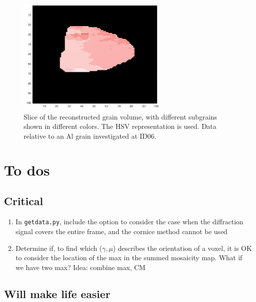 \documentclass[11pt]{scrartcl}
\begin{document}
\begin{figure}[h]
    \centering
    \includegraphics[width=0.65\textwidth]{Mosaicity_slice_new.png}
    \caption{Slice of the reconstructed grain volume, with different subgrains shown in different colors. The {\footnotesize{HSV}} representation is used. Data relative to an Al grain investigated at {\footnotesize{ID06}}.}
    \label{fig:mosaicity_slice}
\end{figure}

\section{To dos}

\subsection{Critical}

\begin{enumerate}
    \item In {\texttt{getdata.py}}, include the option to consider the case when the diffraction signal covers the entire frame, and the cornice method cannot be used
    \item Determine if, to find which ($\gamma, \mu$) describes the orientation of a voxel, it is {\footnotesize{OK}} to consider the location of the max in the summed mosaicity map. What if we have two max? Idea: combine max, {\footnotesize{CM}}
\end{enumerate}

\subsection{Will make life easier}
\end{document}
